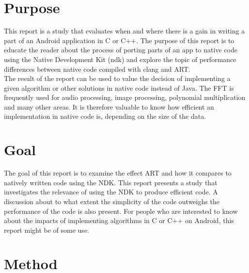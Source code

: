 \section{Purpose}
This report is a study that evaluates when and where there is a gain in writing a part of an Android application in C or C++. The purpose of this report is to educate the reader about the process of porting parts of an app to native code using the Native Development Kit (\gls{ndk}) and explore the topic of performance differences between native code compiled with \gls{clang} and ART.\\

The result of the report can be used to value the decision of implementing a given algorithm or other solutions in native code instead of Java. The FFT is frequently used for audio processing, image processing, polynomial multiplication and many other areas. It is therefore valuable to know how efficient an implementation in native code is, depending on the size of the data.

% 
\section{Goal}
The goal of this report is to examine the effect ART and how it compares to natively written code using the NDK. This report presents a study that investigates the relevance of using the NDK to produce efficient code. A discussion about to what extent the simplicity of the code outweighs the performance of the code is also present. For people who are interested to know about the impacts of implementing algorithms in C or C++ on Android, this report might be of some use.

\section{Method}

